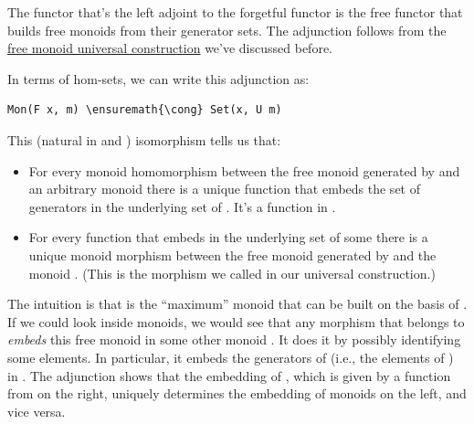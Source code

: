 \noindent
The functor  that's the left adjoint to the forgetful functor
 is the free functor that builds free monoids from their
generator sets. The adjunction follows from the
\hyperref[free-monoids]{free monoid
universal construction} we've discussed before.

In terms of hom-sets, we can write this adjunction as:

\begin{Verbatim}[commandchars=\\\{\}]
Mon(F x, m) \ensuremath{\cong} Set(x, U m)
\end{Verbatim}
This (natural in  and ) isomorphism tells us that:

\begin{itemize}
\tightlist
\item
  For every monoid homomorphism between the free monoid 
  generated by  and an arbitrary monoid  there is a
  unique function that embeds the set of generators  in the
  underlying set of . It's a function in
  .
\item
  For every function that embeds  in the underlying set of
  some  there is a unique monoid morphism between the free
  monoid generated by  and the monoid . (This is the
  morphism we called  in our universal construction.)
\end{itemize}

\begin{figure}[H]
\centering
{}
\end{figure}

\noindent
The intuition is that  is the ``maximum'' monoid that can
be built on the basis of . If we could look inside monoids, we
would see that any morphism that belongs to 
\emph{embeds} this free monoid in some other monoid . It does
it by possibly identifying some elements. In particular, it embeds the
generators of  (i.e., the elements of ) in
. The adjunction shows that the embedding of , which
is given by a function from  on the right,
uniquely determines the embedding of monoids on the left, and vice
versa.

